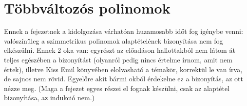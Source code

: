 \documentclass[12pt]{book}
\theoremstyle{plain} %
\theoremstyle{definition} %
\theoremstyle{remark}
\newtheorem*{mj}{Megjegyzés}
\numberwithin{equation}{section}  %
\begin{document}

	\section{Többváltozós polinomok}
	
	
	Ennek a fejezetnek a kidolgozása várhatóan huzamosabb időt fog igénybe venni: \color{red} valószínűleg a szimmetrikus polinomok alaptételének bizonyítása nem fog elkészülni\color{black}. Ennek 2 oka van: egyrészt az előadáson hallottakból nem látom át teljes egészében a bizonyítást (olyanról pedig nincs értelme írnom, amit nem értek), illetve Kiss Emil könyvében elolvasható a témakör, korrektül le van írva, de sajnos nem rövid. Egyelőre akit bármi okból érdekelne ez a bizonyítás, az ott nézze meg. (Maga a fejezet egyes részei el fognak készülni, csak az alaptétel bizonyítása, az indukció nem.)
	
		
	
	
	
	
\end{document}
